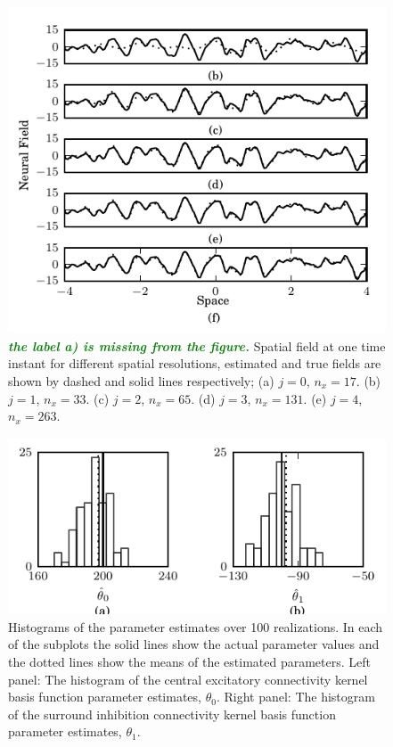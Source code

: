 \documentclass[journal,a4paper]{IEEEtran}
\newcommand{\dean}[1]{\textsf{\emph{\textbf{\textcolor{green}{#1}}}}}
\begin{document}
\begin{figure}[!h] 
 \centering
 \includegraphics[scale=1]{./Graph/Field.pdf}
 \caption{\dean{the label a) is missing from the figure.} Spatial field at one time instant for different spatial resolutions, estimated and true fields are shown by dashed and solid lines respectively; (a) $j=0$, $n_x=17$. (b) $j=1$, $n_x=33$. (c) $j=2$, $n_x=65$. (d) $j=3$, $n_x=131$. (e) $j=4$, $n_x=263$.}
 \label{fig:FieldEstimates}
 \end{figure} 
\begin{figure}[!h] 
 \centering
 \includegraphics[scale=1]{./Graph/Hist.pdf}
 \caption{Histograms of the parameter estimates over 100 realizations. In each of the subplots
the solid lines show the actual parameter values and the dotted lines show the means of the estimated parameters. Left panel: The histogram of the central excitatory connectivity kernel basis function parameter estimates, $\theta_0$. Right panel: The histogram of the surround inhibition connectivity kernel basis function parameter estimates, $\theta_1$.}
 \label{fig:ParametersHistogram}
 \end{figure} 
\end{document}
